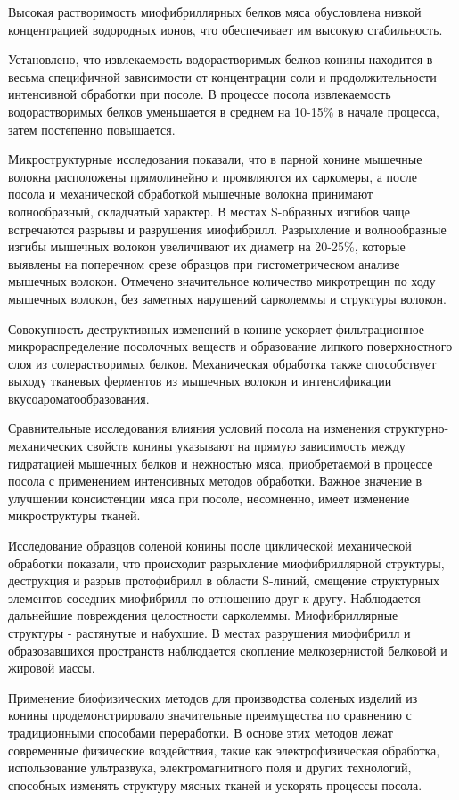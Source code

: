 Высокая растворимость миофибриллярных белков мяса обусловлена низкой
концентрацией водородных ионов, что обеспечивает им высокую
стабильность.

Установлено, что извлекаемость водорастворимых белков конины находится в
весьма специфичной зависимости от концентрации соли и продолжительности
интенсивной обработки при посоле. В процессе посола извлекаемость
водорастворимых белков уменьшается в среднем на 10-15\% в начале
процесса, затем постепенно повышается.

Микроструктурные исследования показали, что в парной конине мышечные
волокна расположены прямолинейно и проявляются их саркомеры, а после
посола и механической обработкой мышечные волокна принимают
волнообразный, складчатый характер. В местах S-образных изгибов чаще
встречаются разрывы и разрушения миофибрилл. Разрыхление и волнообразные
изгибы мышечных волокон увеличивают их диаметр на 20-25\%, которые
выявлены на поперечном срезе образцов при гистометрическом анализе
мышечных волокон. Отмечено значительное количество микротрещин по ходу
мышечных волокон, без заметных нарушений сарколеммы и структуры волокон.

Совокупность деструктивных изменений в конине ускоряет фильтрационное
микрораспределение посолочных веществ и образование липкого
поверхностного слоя из солерастворимых белков. Механическая обработка
также способствует выходу тканевых ферментов из мышечных волокон и
интенсификации вкусоароматообразования.

Сравнительные исследования влияния условий посола на изменения
структурно-механических свойств конины указывают на прямую зависимость
между гидратацией мышечных белков и нежностью мяса, приобретаемой в
процессе посола с применением интенсивных методов обработки. Важное
значение в улучшении консистенции мяса при посоле, несомненно, имеет
изменение микроструктуры тканей.

Исследование образцов соленой конины после циклической механической
обработки показали, что происходит разрыхление миофибриллярной
структуры, деструкция и разрыв протофибрилл в области S-линий, смещение
структурных элементов соседних миофибрилл по отношению друг к другу.
Наблюдается дальнейшие повреждения целостности сарколеммы.
Миофибриллярные структуры - растянутые и набухшие. В местах разрушения
миофибрилл и образовавшихся пространств наблюдается скопление
мелкозернистой белковой и жировой массы.

Применение биофизических методов для производства соленых изделий из
конины продемонстрировало значительные преимущества по сравнению с
традиционными способами переработки. В основе этих методов лежат
современные физические воздействия, такие как электрофизическая
обработка, использование ультразвука, электромагнитного поля и других
технологий, способных изменять структуру мясных тканей и ускорять
процессы посола.

